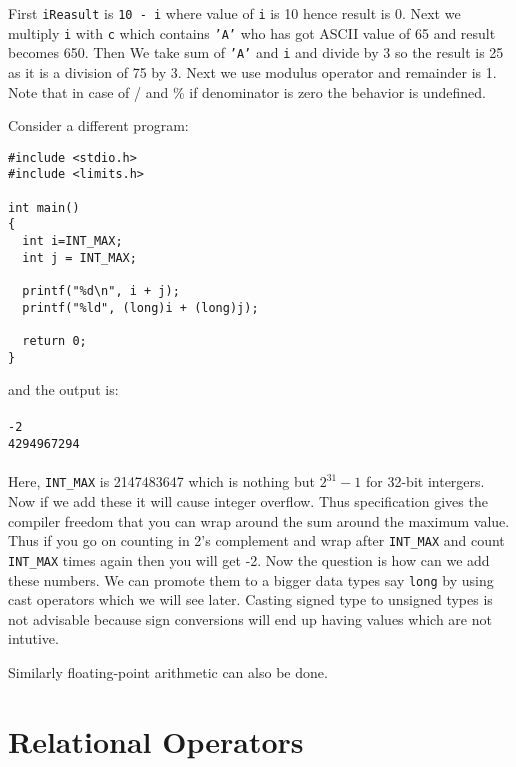 First \texttt{iReasult} is \texttt{10 - i} where value of \texttt{i} is 10
hence result is 0. Next we multiply \texttt{i} with \texttt{c} which
contains \texttt{'A'} who has got ASCII value of 65 and result becomes
650. Then We take sum of \texttt{'A'} and  \texttt{i} and divide by 3 so the
result is 25 as it is a division of 75 by 3. Next we use modulus operator and
remainder is 1. Note that in case of / and \% if denominator is zero the
behavior is undefined.

Consider a different program:

\begin{Verbatim}[frame=single]
#include <stdio.h>
#include <limits.h>

int main()
{
  int i=INT_MAX;
  int j = INT_MAX;

  printf("%d\n", i + j);
  printf("%ld", (long)i + (long)j);

  return 0;
}
\end{Verbatim}

and the output is:
\\\\\texttt{-2\\
4294967294\\\\}
Here, \texttt{INT\_MAX} is 2147483647 which is nothing but $2^{31} - 1$ for
32-bit intergers. Now if we add these it will cause integer overflow. Thus
specification gives the compiler freedom that you can wrap around the sum
around the maximum value. Thus if you go on counting in 2's complement and wrap
after \texttt{INT\_MAX} and count \texttt{INT\_MAX} times again then you will
get -2. Now the question is how can we add these numbers. We can promote them
to a bigger data types say \texttt{long} by using cast operators which we will
see later. Casting signed type to unsigned types is not advisable because sign
conversions will end up having values which are not intutive.

Similarly floating-point arithmetic can also be done.

\section{Relational Operators}
